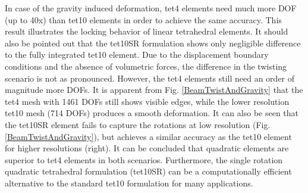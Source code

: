 In case of the gravity induced deformation, tet4 elements need much more DOF (up to 40x) than tet10 elements in order to achieve the same accuracy. This result illustrates the locking behavior of linear tetrahedral elements. It should also be pointed out that the tet10SR formulation shows only negligible difference to the fully integrated tet10 element. Due to the displacement boundary conditions and the absence of volumetric forces, the difference in the twisting scenario is not as pronounced. However, the tet4 elements still need an order of magnitude more DOFs. It is apparent from Fig. \ref{BeamTwistAndGravity} that the tet4 mesh with 1461 DOFs still shows visible edges, while the lower resolution tet10 mesh (714 DOFs) produces a smooth deformation. It can also be seen that the tet10SR element fails to capture the rotations at low resolution (Fig. \ref{BeamTwistAndGravity}), but achieves a similar accuracy as the tet10 element for higher resolutions (right). It can be concluded that quadratic elements are superior to tet4 elements in both scenarios. Furthermore, the single rotation quadratic tetrahedral formulation (tet10SR) can be a computationally efficient alternative to the standard tet10 formulation for many applications.
